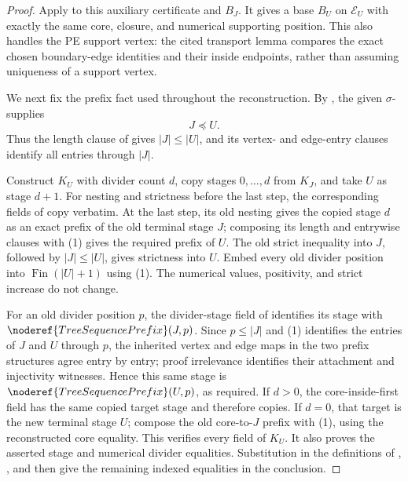 \begin{proof}
Apply  to this auxiliary
certificate and $B_J$.  It gives a base $B_U$ on $\mathcal E_U$ with
exactly the same core, closure, and numerical supporting position.  This
also handles the PE support vertex: the cited transport lemma compares the
exact chosen boundary-edge identities and their inside endpoints, rather
than assuming uniqueness of a support vertex.

We next fix the prefix fact used throughout the reconstruction.  By
, the given
$\sigma$- supplies
\[
                         J\preccurlyeq U.                       \tag{1}
\]
Thus the length clause of  gives
$|J|\leq|U|$, and its vertex- and edge-entry clauses identify all entries
through $|J|$.

Construct $K_U$ with divider count $d$, copy stages $0,\ldots,d$ from
$K_J$, and take $U$ as stage $d+1$.  For nesting and strictness before the
last step, the corresponding fields of
 copy verbatim.  At the last step, its old
nesting gives the copied stage $d$ as an exact prefix of the old terminal
stage $J$; composing its length and entrywise clauses with (1) gives the
required prefix of $U$.  The old strict inequality into $J$, followed by
$|J|\leq|U|$, gives strictness into $U$.  Embed every old divider position
into $\operatorname{Fin}(|U|+1)$ using (1).  The numerical values,
positivity, and strict increase do not change.

For an old divider position $p$, the divider-stage field of
 identifies its stage with
$\noderef{TreeSequencePrefix}(J,p)$.  Since $p\leq|J|$ and (1) identifies
the entries of $J$ and $U$ through $p$, the inherited vertex and edge maps
in the two prefix structures agree entry by entry; proof irrelevance
identifies their attachment and injectivity witnesses.  Hence this same
stage is $\noderef{TreeSequencePrefix}(U,p)$, as required.  If $d>0$, the
core-inside-first field has the same copied target stage and therefore
copies.  If $d=0$, that target is the new terminal stage $U$; compose the
old core-to-$J$ prefix with (1), using the reconstructed core equality.
This verifies every field of $K_U$.  It also proves the asserted stage and
numerical divider equalities.  Substitution in the definitions of
,
, and
 then give the remaining indexed
equalities in the conclusion.


\end{proof}

